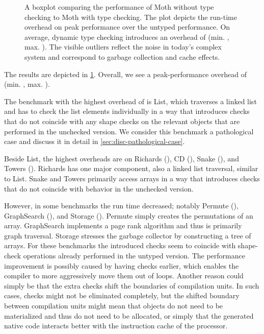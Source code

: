 \begin{figure}
	\TypingOverhead{}
	\caption{A boxplot comparing the performance of Moth without type checking
  to Moth with type checking.
  The plot depicts the run-time overhead on peak performance over
  the untyped performance. On average, dynamic type checking introduces
  an overhead of \OverheadTypingGMeanP (min. \OverheadTypingMinP, max. \OverheadTypingMaxP).
  The visible outliers reflect the noise in today's complex system
  and correspond \eg to garbage collection and cache effects.}
	\label{fig:typing-overhead}
\end{figure}

The results are depicted in \cref{fig:typing-overhead}.
Overall, we see a peak-performance overhead of 
\OverheadTypingGMeanP (min. \OverheadTypingMinP, max. \OverheadTypingMaxP).


The benchmark with the highest overhead of \OverheadListP is List,
which traverses a linked list and has to check the list elements individually
in a way that introduces checks that do not coincide with any shape checks
on the relevant objects that are performed in the unchecked version.
We consider this benchmark a pathological case and discuss it
in detail in \cref{sec:disc-pathological-case}.

Beside List, the highest overheads are on
Richards (\OverheadRichardsP), CD (\OverheadCDP), 
Snake (\OverheadSnakeP), and Towers (\OverheadTowersP).
Richards has one major component, also a linked list traversal,
similar to List.
Snake and Towers primarily access  arrays in a way that introduces checks
that do not coincide with behavior in the unchecked version.


However, in some benchmarks the run time decreased; notably Permute (\OverheadPermuteP),
GraphSearch (\OverheadGraphSearchP), and Storage (\OverheadStorageP).
Permute simply creates the permutations of an array.
GraphSearch implements a page rank algorithm
and thus is primarily graph traversal.
Storage stresses the garbage collector by constructing a tree of arrays.
For these benchmarks the introduced checks seem to coincide with shape-check operations
already performed in the untyped version.
The performance improvement is possibly caused by having checks earlier,
which enables the compiler to more aggressively move them out of loops.
Another reason could simply be that the extra checks shift the boundaries
of compilation units.
In such cases, checks might not be eliminated completely,
but the shifted boundary between compilation units might mean that
objects do not need to be materialized and thus do not need to be allocated,
or simply that the generated native code interacts better with
the instruction cache of the processor.

